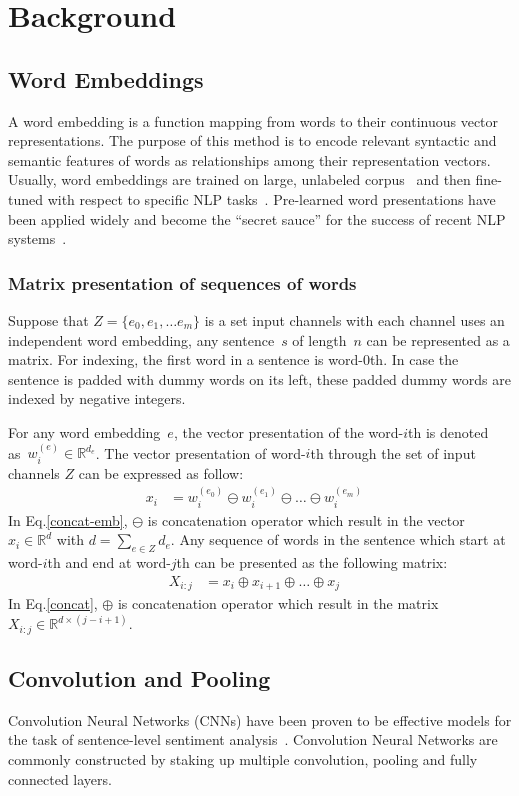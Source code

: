 \section{Background}
\subsection{Word Embeddings}
A word embedding is a function mapping from words to their continuous vector representations.
The purpose of this method is to encode relevant syntactic and semantic features of words as relationships among their representation vectors.
Usually, word embeddings are trained on large, unlabeled corpus~\cite{glove,word2vec} and then fine-tuned with respect to specific NLP tasks~\cite{treeLSTM,KimCNN}.   
Pre-learned word presentations have been applied widely and become the ``secret sauce'' for the success of recent NLP systems~\cite{Luong_betterword}.
\subsubsection{Matrix presentation of sequences of words}
Suppose that \(Z = \{e_0, e_1, \ldots e_m\}\) is a set input channels with each channel uses an independent word embedding, any sentence~\(s\) of length~\(n\) can be represented as a matrix.
For indexing, the first word in a sentence is word-\(0\)th.
In case the sentence is padded with dummy words on its left, these padded dummy words are indexed by negative integers.

For any word embedding~\(e\), the vector presentation of the word-\(i\)th is denoted as~\(w^{(e)}_i \in \mathbb{R}^{d_e}\).
The vector presentation of word-\(i\)th through the set of input channels \(Z\) can be expressed as follow:
\begin{align}
 x_i &= w^{(e_0)}_i \ominus w^{(e_1)}_i \ominus  \ldots \ominus w^{(e_m)}_i&\label{concat-emb}
\end{align}
In Eq.\eqref{concat-emb}, \(\ominus\) is concatenation operator which result in the vector \(x_i \in \mathbb{R}^{d}\) with \(d = \sum_{e \in Z} d_e\).
Any sequence of words in the sentence which start at word-\(i\)th and end at word-\(j\)th can be presented as the following matrix:
\begin{align}
X_{i:j} &= x_i \oplus x_{i+1} \oplus \ldots \oplus x_j &\label{concat}
\end{align}
In Eq.\eqref{concat}, \(\oplus\) is concatenation operator which result in the matrix \(X_{i:j} \in \mathbb{R}^{d \times (j-i+1)}\).
\subsection{Convolution and Pooling}
Convolution Neural Networks (CNNs) have been proven to be effective models for the task of sentence-level sentiment analysis~\cite{KimCNN, DCNN,2-layer-cnn}.
Convolution Neural Networks are commonly constructed by staking up multiple convolution, pooling and fully connected layers.
